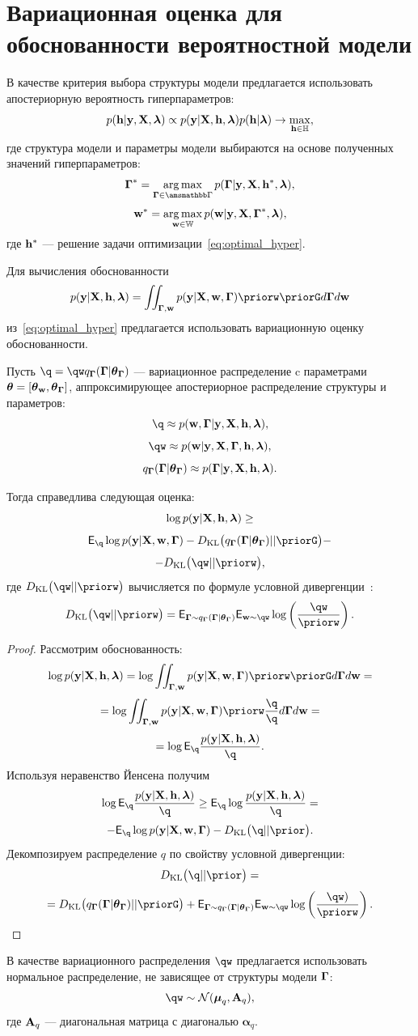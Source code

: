 \section{Вариационная оценка для обоснованности вероятностной модели}
В качестве критерия выбора структуры модели предлагается использовать апостериорную вероятность гиперпараметров:
\begin{equation}
\label{eq:optimal_hyper}
    p(\mathbf{h}|\mathbf{y}, \mathbf{X},\boldsymbol{\lambda}) \propto p(\mathbf{y}|\mathbf{X}, \mathbf{h},\boldsymbol{\lambda}) p(\mathbf{h}|\boldsymbol{\lambda}) \to \max_{\mathbf{h} \in \mathbb{H}},
\end{equation}
где структура модели и параметры модели выбираются на основе полученных значений гиперпараметров:
\[
    \G^* = \argmax_{\G \in \Gb} p(\G|\y, \X, \h^*, \lam ),
\]
\[
    \mathbf{w}^* = \operatorname*{arg\,max}_{\mathbf{w} \in \mathbb{W}} p(\mathbf{w}|\mathbf{y}, \mathbf{X}, \boldsymbol{\Gamma}^*, \boldsymbol{\lambda}),
\]
где $\mathbf{h}^*$ --- решение задачи оптимизации~\eqref{eq:optimal_hyper}.

Для вычисления обоснованности $$\EV = \iint_{\G, \w}\LL \priorw \priorG d\G d\w$$ из~\eqref{eq:optimal_hyper} предлагается использовать вариационную оценку обоснованности.

\begin{theorem}
Пусть $\q = \qw \qG$ --- вариационное распределение c параметрами $\boldsymbol{\theta}= [\boldsymbol{\theta}_\mathbf{w}, \boldsymbol{\theta}_{\boldsymbol{\Gamma}} ]$, аппроксимирующее апостериорное распределение структуры и параметров:
\[
    \q \approx \post,
\]
\[
    \qw  \approx \postw,
\]
\[
    q_{\boldsymbol{\Gamma}}(\boldsymbol{\Gamma}|\boldsymbol{\theta}_{\boldsymbol{\Gamma}}) \approx p(\boldsymbol{\Gamma}|\mathbf{y}, \mathbf{X}, \mathbf{h},\boldsymbol{\lambda}).
\]

Тогда справедлива следующая оценка:
\begin{equation}
\label{eq:full_elbo}
\log p(\mathbf{y}|\mathbf{X}, \mathbf{h},\boldsymbol{\lambda}) \geq
\end{equation}
\[
 \E_{\q}  \log \LL - \KL{\qG}{\priorG} - 
\]
\[
 - \KL{\qw}{\priorw},
\]
где $\KL{\qw}{\priorw}$ вычисляется по формуле условной дивергенции~\cite{TODO}:
\[
\KL{\qw}{\priorw} = \E_{\G \sim \qG} \E_{\w \sim \qw} \log \left(\frac{\qw}{\priorw}\right).
\]
\end{theorem}

\begin{proof}
Рассмотрим обоснованность:
\[
\log \EV  =  \log \iint_{\G,\w} \LL \priorw \priorG d\G d\w  =
\]
\[
   = \log\iint_{\G,\w} \LL \priorw \frac{\q}{\q}d\G d\w =
\]
\[
  =  \log \E_{\q} \frac{\EV}{\q}.
\]
Используя неравенство Йенсена получим 
\[
 \log \E_{\q} \frac{\EV}{\q} \geq  \E_{\q}\log \frac{\EV}{\q} = 
\]
\[
 -  \E_{\q} \log \LL - \KL{\q}{\prior}.
\]
Декомпозируем распределение $q$ по свойству условной дивергенции:
\[
\KL{\q}{\prior} = 
\]
\begin{equation}
\label{eq:kl_full}
= \KL{\qG}{\priorG} + \E_{\G \sim \qG} \E_{\w \sim \qw} \log \left(\frac{\qw)}{\priorw}\right).    
\end{equation}
\end{proof}
В качестве вариационного распределения $\qw$ предлагается использовать нормальное распределение, не зависящее от структуры модели $\boldsymbol{\Gamma}$:
\[
    \qw  \sim \mathcal{N}(\boldsymbol{\mu}_q, \A_q), 
\]
где $\mathbf{A}_q$ --- диагональная матрица с диагональю $\boldsymbol{\alpha}_q$.

